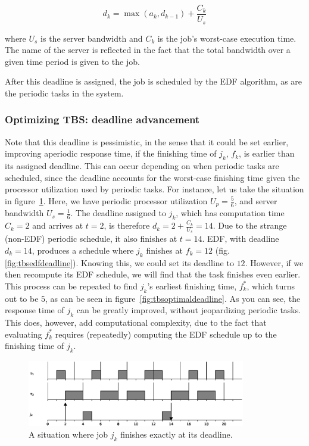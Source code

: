 \documentclass[twoside]{uva-inf-bachelor-thesis}
\begin{document}
\[ d_k = \max(a_k, d_{k-1}) + \frac{C_k}{U_s} \]

where $U_s$ is the server bandwidth and $C_k$ is the job's worst-case execution time. The name of the server is reflected in the fact that the total bandwidth over a given time period is given to the job.

After this deadline is assigned, the job is scheduled by the EDF algorithm, as are the periodic tasks in the system.

\subsubsection{Optimizing TBS: deadline advancement}
Note that this deadline is pessimistic, in the sense that it could be set earlier, improving aperiodic response time, if the finishing time of $j_k$, $f_k$, is earlier than its assigned deadline. This can occur depending on when periodic tasks are scheduled, since the deadline accounts for the worst-case finishing time given the processor utilization used by periodic tasks. For instance, let us take the situation in figure~\ref{fig:tbsworstdeadline}. Here, we have periodic processor utilization $U_p = \frac{5}{6}$, and server bandwidth $U_s = \frac{1}{6}$. The deadline assigned to $j_k$, which has computation time $C_k = 2$ and arrives at $t = 2$, is therefore $d_k = 2 + \frac{C_k}{U_s} = 14$. Due to the strange (non-EDF) periodic schedule, it also finishes at $t = 14$. EDF, with deadline $d_k = 14$, produces a schedule where $j_k$ finishes at $f_k = 12$ (fig. \ref{fig:tbsedfdeadline}). Knowing this, we could set its deadline to $12$. However, if we then recompute its EDF schedule, we will find that the task finishes even earlier. This process can be repeated to find $j_k$'s earliest finishing time, $f^*_k$, which turns out to be $5$, as can be seen in figure~\ref{fig:tbsoptimaldeadline}. As you can see, the response time of $j_k$ can be greatly improved, without jeopardizing periodic tasks. This does, however, add computational complexity, due to the fact that evaluating $f^*_k$ requires (repeatedly) computing the EDF schedule up to the finishing time of $j_k$.

\begin{figure}[htpb]
    \centering
    \includegraphics[width=0.85\textwidth]{worstcasedeadline.eps}
    \caption{A situation where job $j_k$ finishes exactly at its deadline.}
    \label{fig:tbsworstdeadline}
\end{figure}
\end{document}

